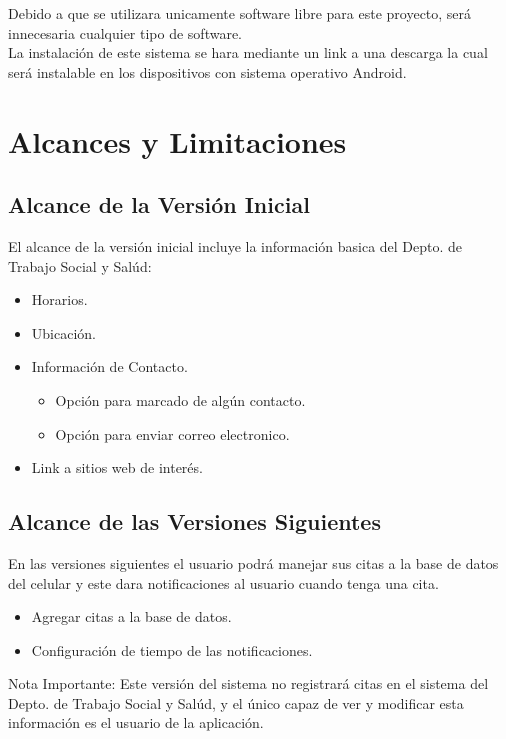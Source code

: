 \documentclass[12pt]{article}
\begin{document}
Debido a que se utilizara unicamente software libre para este proyecto, ser\'a innecesaria cualquier tipo de software.\\
La instalaci\'on de este sistema se hara mediante un link a una descarga la cual ser\'a instalable en los dispositivos con sistema operativo Android.

\newpage
\section{Alcances y Limitaciones}

\subsection{Alcance de la Versi\'on Inicial}

El alcance de la versi\'on inicial incluye la informaci\'on basica del Depto. de Trabajo Social y Sal\'ud:
\begin{itemize}
	\item{Horarios.}
	\item{Ubicaci\'on.}
	\item{Informaci\'on de Contacto.}
	\begin{itemize}
		\item{Opci\'on para marcado de alg\'un contacto.}
		\item{Opci\'on para enviar correo electronico.}
	\end{itemize}
	\item{Link a sitios web de inter\'es.}
\end{itemize}

\subsection{Alcance de las Versiones Siguientes}

En las versiones siguientes el usuario podr\'a manejar sus citas a la base de datos del celular y este dara notificaciones al usuario cuando tenga una cita.

\begin{itemize}
	\item{Agregar citas a la base de datos.}
	\item{Configuraci\'on de tiempo de las notificaciones.}
\end{itemize}
\begin{footnotesize} Nota Importante: Este versi\'on del sistema no registrar\'a citas en el sistema del Depto. de Trabajo Social y Sal\'ud, y el \'unico capaz de ver y modificar esta informaci\'on es el usuario de la aplicaci\'on. \end{footnotesize}
\end{document}
